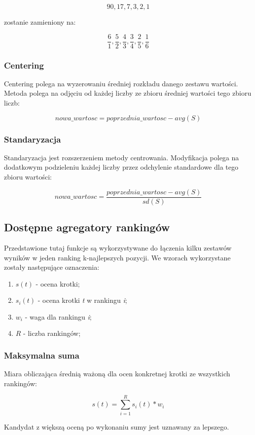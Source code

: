 $$ 90, 17, 7, 3, 2, 1 $$

zostanie zamieniony na:

$$ \frac{6}{1}, \frac{5}{2}, \frac{4}{3}, \frac{3}{4}, \frac{2}{5}, \frac{1}{6} $$

\subsubsection{Centering}
Centering polega na wyzerowaniu średniej rozkładu danego zestawu wartości.
Metoda polega na odjęciu od każdej liczby ze zbioru średniej wartości tego zbioru liczb:

$$ nowa\_wartosc = poprzednia\_wartosc - avg(S) $$

\subsubsection{Standaryzacja}
Standaryzacja jest rozszerzeniem metody centrowania.
Modyfikacja polega na dodatkowym podzieleniu każdej liczby przez odchylenie standardowe dla tego zbioru wartości:

$$ nowa\_wartosc = \frac{poprzednia\_wartosc - avg(S)}{sd(S)} $$


\subsection{Dostępne agregatory rankingów}
Przedstawione tutaj funkcje są wykorzystywane do łączenia kilku zestawów wyników w jeden ranking k-najlepszych pozycji.
We wzorach wykorzystane zostały następujące oznaczenia:
\begin{enumerate}
	\item $ s(t) $ - ocena krotki;
	\item $ s_{i}(t) $ - ocena krotki \emph{t} w rankingu \emph{i};
	\item $ w_{i} $ - waga dla rankingu \emph{i};
	\item $ R $ - liczba rankingów;
\end{enumerate}

\subsubsection{Maksymalna suma}
Miara obliczająca średnią ważoną dla ocen konkretnej krotki ze wszystkich rankingów:

$$ s(t) = \sum_{i=1}^{R} s_{i}(t) * w_{i} $$

Kandydat z większą oceną po wykonaniu sumy jest uznawany za lepszego.

